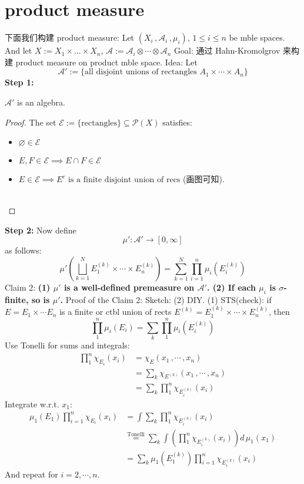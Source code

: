 \documentclass[lang=cn,11pt]{elegantbook}
\begin{document}
\section{product measure}
下面我们构建 product measure: 
Let $(X_i \,,\mathcal{A}_i\, , \mu_i)$, $1 \leq i \leq n$ be mble spaces.\\
    And let $X := X_1 \times ... \times X_n$, $\mathcal{A}:= \mathcal{A}_i \otimes \cdots \otimes \mathcal{A}_n$
Goal: 通过 Hahn-Kromolgrov 来构建 product measure on product mble space.
Idea: Let $$\mathcal{A}' := \{   \text{all disjoint  unions of rectangles } A_1 \times \cdots \times A_n\}$$
\textbf{Step 1: }
\begin{proposition}
   $\mathcal{A}'$ is an algebra.
\end{proposition}
\begin{proof}
The set $\mathcal{E}:= \{\text{rectangles}\} \subseteq \mathcal{P}(X)$ satisfies:
    \begin{itemize}
        \item $\varnothing \in \mathcal{E}$
        \item $E,F \in \mathcal{E} \implies E \cap F \in \mathcal{E}$
        \item $E \in \mathcal{ E} \implies E^c \text{ is a finite disjoint union of recs}$ (画图可知).\\\\
    \end{itemize}
\end{proof}

\textbf{Step 2: }
Now define $$\mu' : \mathcal{A}' \rightarrow [0,\infty]$$ as follows: $$ \mu'(\bigsqcup_{k=1}^N E_1^{(k)} \times \cdots \times E_n^{(k)}) = \sum_{k=1}^N \prod_{i=1}^n \mu_i (E_i^{(k)}) $$
Claim 2:
   \textbf{ (1) $\mu'$ is a well-defined premeasure on $\mathcal{A}'$.
    (2) If each $\mu_i$ is $\sigma$-finite, so is $\mu'$.}
Proof of the Claim 2: 
 Sketch: (2) DIY.
    (1) STS(check): if $E = E_1 \times \cdots E_n$ is a finite or ctbl union of rects $E^{(k)} = E_1^{(k)}\times \cdots \times E_n^{(k)} $, then $$\prod_1^n  \mu_i(E_i) = \sum_k \prod_1^n \mu_i(E_i^{(k)})  $$
 Use Tonelli for sums and integrals: \begin{align}
        \prod_1^n \chi_{E_i} (x_i) &= \chi_E (x_1\,, \cdots \,,x_n) \\
        &= \sum_k \chi_{E^{(k)}} (x_1 \,, \cdots \,, x_n) \\
        &= \sum_k \prod_1^n \chi_{E_i^{(k)}} (x_i)
    \end{align}
Integrate w.r.t. $x_1$: 
\begin{align}
\mu_1(E_1) \prod_{i=1}^n \chi_{E_i} (x_i)& = \int \sum_k \prod_1^n \chi_{E_i ^{(k)}} (x_i)    \\
&\overset{\text{Tonelli}}{=}  \sum_k  \int (\prod_1^n   \chi_{E_i ^{(k)}} (x_i) )  d \, \mu_1 (x_1) \\
& = \sum_k \mu_1(E_1^{(k)}) \prod_{i=1}^n \chi_{E_i^{(k)}} (x_i)
\end{align}
And repeat for $i=2,\cdots,n$.\\\\
\end{document}
